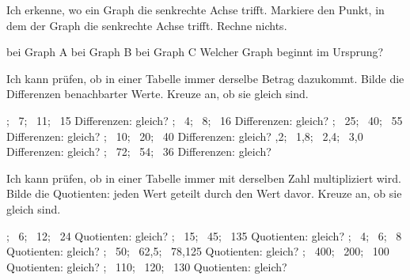 \begin{aufgabe}{Ich erkenne, wo ein Graph die senkrechte Achse trifft.}
Markiere den Punkt, in dem der Graph die senkrechte Achse trifft. Rechne nichts.

\begin{ksys}[xmin=0,xmax=5,ymin=0,ymax=8,ystep=2,ablesen]
\end{ksys}\ksysabstand\begin{ksys}[xmin=0,xmax=5,ymin=0,ymax=8,ystep=2,ablesen]
\end{ksys}\ksysabstand\begin{ksys}[xmin=0,xmax=5,ymin=0,ymax=8,ystep=2,ablesen]
\end{ksys}

\begin{teile}
\teil bei Graph A
\teil bei Graph B
\teil bei Graph C
\teil Welcher Graph beginnt im Ursprung? \quad {}
\end{teile}
\end{aufgabe}


\begin{aufgabe}{Ich kann prüfen, ob in einer Tabelle immer derselbe Betrag dazukommt.}
Bilde die Differenzen benachbarter Werte. Kreuze an, ob sie gleich sind.
\begin{teile}
; \ 7; \ 11; \ 15 \quad Differenzen: \leerfeld \quad gleich? \janein
{}; \ 4; \ 8; \ 16 \quad Differenzen: \leerfeld \quad gleich? \janein
{}; \ 25; \ 40; \ 55 \quad Differenzen: \leerfeld \quad gleich? \janein
{}; \ 10; \ 20; \ 40 \quad Differenzen: \leerfeld \quad gleich? \janein
{},2; \ 1,8; \ 2,4; \ 3,0 \quad Differenzen: \leerfeld \quad gleich? \janein
{}; \ 72; \ 54; \ 36 \quad Differenzen: \leerfeld \quad gleich? \janein
\end{teile}
\end{aufgabe}

\begin{aufgabe}{Ich kann prüfen, ob in einer Tabelle immer mit derselben Zahl multipliziert wird.}
Bilde die Quotienten: jeden Wert geteilt durch den Wert davor. Kreuze an, ob sie gleich sind.
\begin{teile}
; \ 6; \ 12; \ 24 \quad Quotienten: \leerfeld \quad gleich? \janein
{}; \ 15; \ 45; \ 135 \quad Quotienten: \leerfeld \quad gleich? \janein
{}; \ 4; \ 6; \ 8 \quad Quotienten: \leerfeld \quad gleich? \janein
{}; \ 50; \ 62,5; \ 78,125 \quad Quotienten: \leerfeld \quad gleich? \janein
{}; \ 400; \ 200; \ 100 \quad Quotienten: \leerfeld \quad gleich? \janein
{}; \ 110; \ 120; \ 130 \quad Quotienten: \leerfeld \quad gleich? \janein
\end{teile}
\end{aufgabe}

